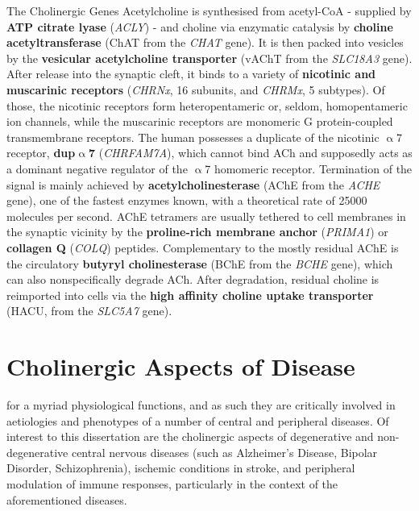 \begin{mybox}{The Cholinergic Genes}\label{box:chol-genes}
Acetylcholine is synthesised from acetyl-CoA - supplied by \textbf{ATP citrate lyase} (\emph{ACLY}) - and choline via enzymatic catalysis by \textbf{choline acetyltransferase} (ChAT from the \emph{CHAT} gene). It is then packed into vesicles by the \textbf{vesicular acetylcholine transporter} (vAChT from the \emph{SLC18A3} gene). After release into the synaptic cleft, it binds to a variety of \textbf{nicotinic and muscarinic receptors} (\emph{CHRNx}, 16 subunits, and \emph{CHRMx}, 5 subtypes). Of those, the nicotinic receptors form heteropentameric or, seldom, homopentameric ion channels, while the muscarinic receptors are monomeric G protein-coupled transmembrane receptors. The human possesses a duplicate of the nicotinic $\upalpha$7 receptor, \textbf{dup$\upalpha$7} (\emph{CHRFAM7A}), which cannot bind ACh and supposedly acts as a dominant negative regulator of the $\upalpha$7 homomeric receptor. Termination of the signal is mainly achieved by \textbf{acetylcholinesterase} (AChE from the \emph{ACHE} gene), one of the fastest enzymes known, with a theoretical rate of \num{25000} molecules per second. AChE tetramers are usually tethered to cell membranes in the synaptic vicinity by the \textbf{proline-rich membrane anchor} (\emph{PRIMA1}) or \textbf{collagen Q} (\emph{COLQ}) peptides. Complementary to the mostly residual AChE is the circulatory \textbf{butyryl cholinesterase} (BChE from the \emph{BCHE} gene), which can also nonspecifically degrade ACh. After degradation, residual choline is reimported into cells via the \textbf{high affinity choline uptake transporter} (HACU, from the \emph{SLC5A7} gene).
\end{mybox}

\section{Cholinergic Aspects of Disease} \label{sec:intro:diseases}
 for a myriad physiological functions, and as such they are critically involved in aetiologies and phenotypes of a number of central and peripheral diseases. Of interest to this dissertation are the cholinergic aspects of degenerative and non-degenerative central nervous diseases (such as Alzheimer's Disease, Bipolar Disorder, Schizophrenia), ischemic conditions in stroke, and peripheral modulation of immune responses, particularly in the context of the aforementioned diseases.

